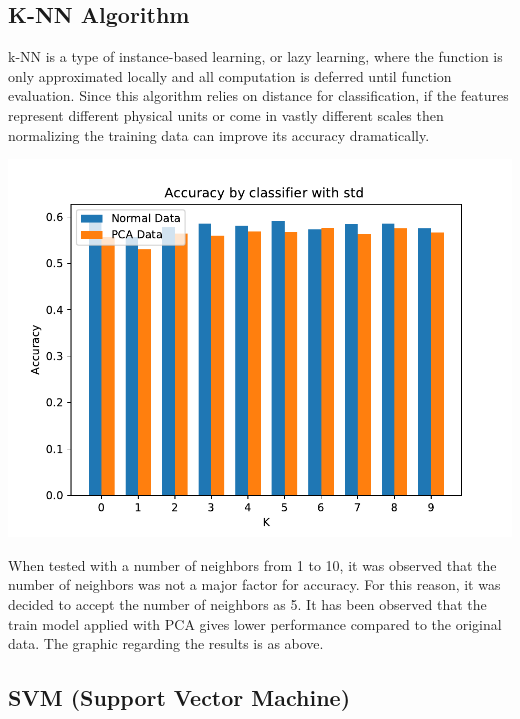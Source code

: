 \documentclass{article}
\begin{document}
\subsection{ K-NN Algorithm}

k-NN is a type of instance-based learning, or lazy learning, where the function is only approximated locally and all computation is deferred until function evaluation. Since this algorithm relies on distance for classification, if the features represent different physical units or come in vastly different scales then normalizing the training data can improve its accuracy dramatically.\newline

\begin{center}
    \vspace{1em}
        \includegraphics[scale=0.80]{graphs/KNN.pdf}
    \vspace{1em}
\end{center}

When tested with a number of neighbors from 1 to 10, it was observed that the number of neighbors was not a major factor for accuracy. For this reason, it was decided to accept the number of neighbors as 5. It has been observed that the train model applied with PCA gives lower performance compared to the original data. The graphic regarding the results is as above.


\subsection{ SVM (Support Vector Machine)}
\end{document}
